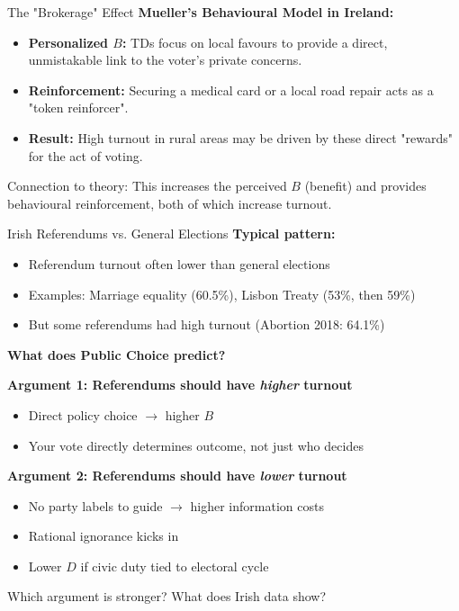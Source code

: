 \documentclass[10pt]{beamer}
\begin{document}
\begin{frame}{The "Brokerage" Effect}
\textbf{Mueller's Behavioural Model in Ireland:}
\begin{itemize}
\item \textbf{Personalized $B$:} TDs focus on local favours to provide a direct, unmistakable link to the voter's private concerns.
\item \textbf{Reinforcement:} Securing a medical card or a local road repair acts as a "token reinforcer".
\item \textbf{Result:} High turnout in rural areas may be driven by these direct "rewards" for the act of voting.
\end{itemize}



\alert{Connection to theory:} This increases the perceived $B$ (benefit) and provides behavioural reinforcement, both of which increase turnout.
\end{frame}

\begin{frame}{Irish Referendums vs. General Elections}
\textbf{Typical pattern:}
\begin{itemize}
\item Referendum turnout often \alert{lower} than general elections
\item Examples: Marriage equality (60.5\%), Lisbon Treaty (53\%, then 59\%)
\item But some referendums had high turnout (Abortion 2018: 64.1\%)
\end{itemize}



\textbf{What does Public Choice predict?}

\textbf{Argument 1: Referendums should have \emph{higher} turnout}
\begin{itemize}
\item Direct policy choice $\rightarrow$ higher $B$
\item Your vote directly determines outcome, not just who decides
\end{itemize}

\textbf{Argument 2: Referendums should have \emph{lower} turnout}
\begin{itemize}
\item No party labels to guide $\rightarrow$ higher information costs
\item Rational ignorance kicks in
\item Lower $D$ if civic duty tied to electoral cycle
\end{itemize}



Which argument is stronger? What does Irish data show?
\end{frame}
\end{document}
